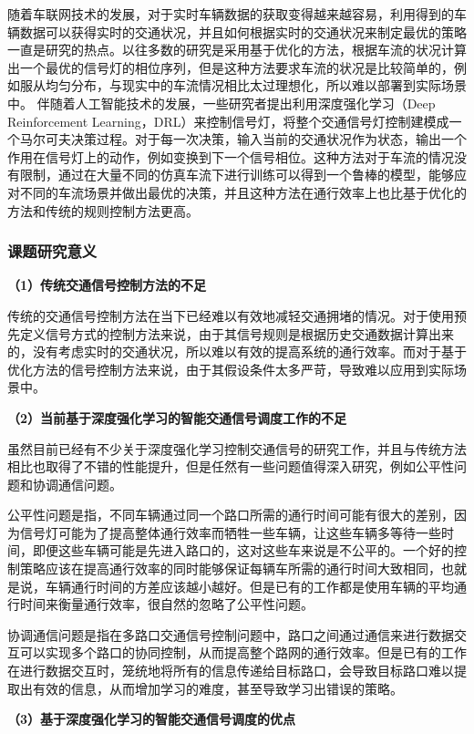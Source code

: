 随着车联网技术的发展，对于实时车辆数据的获取变得越来越容易，利用得到的车辆数据可以获得实时的交通状况，并且如何根据实时的交通状况来制定最优的策略一直是研究的热点。以往多数的研究是采用基于优化的方法，根据车流的状况计算出一个最优的信号灯的相位序列，但是这种方法要求车流的状况是比较简单的，例如服从均匀分布，与现实中的车流情况相比太过理想化，所以难以部署到实际场景中。
伴随着人工智能技术的发展，一些研究者提出利用深度强化学习（Deep Reinforcement Learning，DRL）来控制信号灯，将整个交通信号灯控制建模成一个马尔可夫决策过程。对于每一次决策，输入当前的交通状况作为状态，输出一个作用在信号灯上的动作，例如变换到下一个信号相位。这种方法对于车流的情况没有限制，通过在大量不同的仿真车流下进行训练可以得到一个鲁棒的模型，能够应对不同的车流场景并做出最优的决策，并且这种方法在通行效率上也比基于优化的方法和传统的规则控制方法更高。

\subsubsection{课题研究意义}
\textbf{（1）传统交通信号控制方法的不足}

传统的交通信号控制方法在当下已经难以有效地减轻交通拥堵的情况。对于使用预先定义信号方式的控制方法来说，由于其信号规则是根据历史交通数据计算出来的，没有考虑实时的交通状况，所以难以有效的提高系统的通行效率。而对于基于优化方法的信号控制方法来说，由于其假设条件太多严苛，导致难以应用到实际场景中。

\textbf{（2）当前基于深度强化学习的智能交通信号调度工作的不足}

虽然目前已经有不少关于深度强化学习控制交通信号的研究工作，并且与传统方法相比也取得了不错的性能提升，但是任然有一些问题值得深入研究，例如公平性问题和协调通信问题。

公平性问题是指，不同车辆通过同一个路口所需的通行时间可能有很大的差别，因为信号灯可能为了提高整体通行效率而牺牲一些车辆，让这些车辆多等待一些时间，即便这些车辆可能是先进入路口的，这对这些车来说是不公平的。一个好的控制策略应该在提高通行效率的同时能够保证每辆车所需的通行时间大致相同，也就是说，车辆通行时间的方差应该越小越好。但是已有的工作都是使用车辆的平均通行时间来衡量通行效率，很自然的忽略了公平性问题。

协调通信问题是指在多路口交通信号控制问题中，路口之间通过通信来进行数据交互可以实现多个路口的协同控制，从而提高整个路网的通行效率。但是已有的工作在进行数据交互时，笼统地将所有的信息传递给目标路口，会导致目标路口难以提取出有效的信息，从而增加学习的难度，甚至导致学习出错误的策略。

\textbf{（3）基于深度强化学习的智能交通信号调度的优点}

